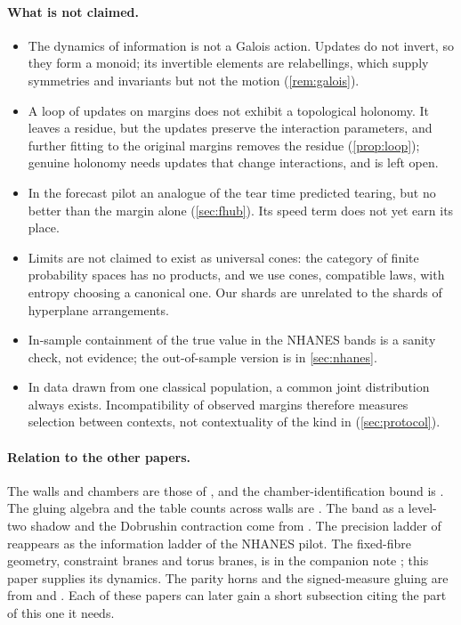 \documentclass[11pt]{article}
\theoremstyle{definition}
\theoremstyle{remark}
\begin{document}
\paragraph{What is not claimed.}
\begin{itemize}[leftmargin=*,nosep]
\item The dynamics of information is not a Galois action. Updates do not invert, so they form a monoid; its invertible
  elements are relabellings, which supply symmetries and invariants but not the motion (\cref{rem:galois}).
\item A loop of updates on margins does not exhibit a topological holonomy. It leaves a residue, but the updates
  preserve the interaction parameters, and further fitting to the original margins removes the residue (\cref{prop:loop});
  genuine holonomy needs updates that change interactions, and is left open.
\item In the forecast pilot an analogue of the tear time predicted tearing, but no better than the margin alone
  (\cref{sec:fhub}). Its speed term does not yet earn its place.
\item Limits are not claimed to exist as universal cones: the category of finite probability spaces has no products, and we use
  cones, compatible laws, with entropy choosing a canonical one. Our shards are unrelated to the shards of hyperplane arrangements.
\item In-sample containment of the true value in the NHANES bands is a sanity check, not evidence; the out-of-sample
  version is in \cref{sec:nhanes}.
\item In data drawn from one classical population, a common joint distribution always exists. Incompatibility of observed
  margins therefore measures selection between contexts, not contextuality of the kind in \cite{Conditionals}
  (\cref{sec:protocol}).
\end{itemize}

\paragraph{Relation to the other papers.} The walls and chambers are those of \cite[Def.~6.3, Prop.~6.6]{Conditionals}, and the
chamber-identification bound is \cite[Prop.~12.2]{Conditionals}. The gluing algebra and the table counts across walls are
\cite[Thm.~2.2, Prop.~7.3]{Algebras}. The band as a level-two shadow and the Dobrushin contraction come from
\cite[Prop.~9.14, Prop.~11.2]{Tower}. The precision ladder of \cite[Thm.~3.5]{Attribution} reappears as the information
ladder of the NHANES pilot. The fixed-fibre geometry, constraint branes and torus branes, is in the companion note
\cite{Bridges}; this paper supplies its dynamics. The parity horns and the signed-measure gluing are from \cite[Thm.~4.3]{Conditionals} and
\cite[Prop.~35.1]{ThreeLayers}. Each of these papers can later gain a short subsection citing the part of this one it
needs.
\end{document}
